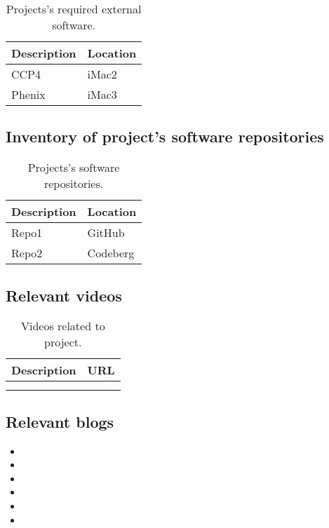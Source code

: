 \documentclass[11pt,letterpaper]{article}
\begin{document}
\begin{table}[htbp]
\caption[External software]{Projects's required external software.}
\centering
\begin{tabular}{ll}
Description & Location\\[0pt]
\hline
CCP4 & iMac2\\[0pt]
Phenix & iMac3\\[0pt]
\end{tabular}
\end{table}



\subsection{Inventory of project's software repositories}
\label{sec:org351d456}


\begin{table}[htbp]
\caption[Software repos]{Projects's software repositories.}
\centering
\begin{tabular}{ll}
Description & Location\\[0pt]
\hline
Repo1 & GitHub\\[0pt]
Repo2 & Codeberg\\[0pt]
\end{tabular}
\end{table}



\subsection{Relevant videos}
\label{sec:org6b1444e}

\begin{table}[htbp]
\caption[Related videos]{Videos related to project.}
\centering
\begin{tabular}{ll}
Description & URL\\[0pt]
\hline
 & \\[0pt]
 & \\[0pt]
\end{tabular}
\end{table}


\subsection{Relevant blogs}
\label{sec:org8fe52bf}
\begin{itemize}
\item 

\item 

\item 

\item 

\item 

\item 
\end{itemize}
\end{document}
